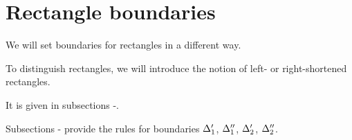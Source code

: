 \section{Rectangle boundaries}
\label{section_boundaries}


We will set boundaries for rectangles in a different way.

To distinguish rectangles, we will introduce the notion of left- or right-shortened rectangles.

It is given in subsections -.

Subsections -
provide the rules for boundaries $\Delta_1'$, $\Delta_1''$, $\Delta_2'$, $\Delta_2''$.






